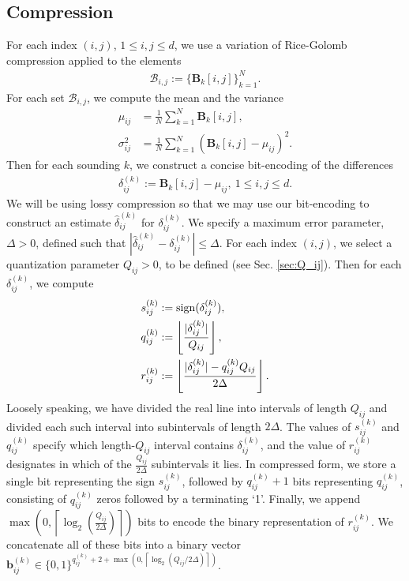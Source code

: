 \documentclass{article}
\begin{document}
\subsection{Compression}
\label{sec:compression} 
For each index $(i, j)$, $1 \le i,j \le d$, we use a variation of Rice-Golomb compression applied to the elements 
\begin{align} \mathcal{B}_{i,j} := \{\mathbf{B}_k[i, j]\}_{k = 1}^N.
\end{align} 
For each set $\mathcal{B}_{i,j}$, we compute the mean and the variance
\begin{align} 
\mu_{ij} & = \frac{1}{N} \sum_{k = 1}^N \mathbf{B}_k[i, j], \\ 
\sigma^2_{ij} & = \frac{1}{N} \sum_{k = 1}^N (\mathbf{B}_k[i, j] - \mu_{ij})^2. 
\end{align}  
Then for each sounding $k$, we construct a concise bit-encoding of the differences 
\begin{align} 
\delta^{(k)}_{ij} := \mathbf{B}_k[i,j] - \mu_{ij}, ~ 1 \le i,j \le d. 
\end{align} 
We will be using lossy compression so that we may use our bit-encoding to construct an estimate $\hat{\delta}^{(k)}_{ij}$ for $\delta^{(k)}_{ij}$. We specify a maximum error parameter, $\Delta > 0$, defined such that $| \hat{\delta}^{(k)}_{ij} - \delta^{(k)}_{ij}|\le \Delta$. For each index $(i, j)$, we select a quantization parameter $Q_{ij} > 0$, to be defined (see Sec. \ref{sec:Q_ij}). Then for each $\delta^{(k)}_{ij}$, we compute 
\begin{align} 
s^{(k)}_{ij} & := {\rm sign}(\delta^{(k)}_{ij}), \\ 
q^{(k)}_{ij} & := \left \lfloor \frac{|\delta^{(k)}_{ij}|}{Q_{ij}} \right \rfloor, \\ 
r^{(k)}_{ij} & := \left \lfloor \frac{|\delta^{(k)}_{ij}| - q^{(k)}_{ij} Q_{ij}}{2\Delta} \right \rfloor. 
\end{align} 
Loosely speaking, we have divided the real line into intervals of length $Q_{ij}$ and divided each such interval into subintervals of length $2\Delta$. The values of $s^{(k)}_{ij}$ and $q^{(k)}_{ij}$ specify which length-$Q_{ij}$ interval contains $\delta^{(k)}_{ij}$, and the value of $r^{(k)}_{ij}$ designates in which of the $\frac{Q_{ij}}{2 \Delta}$ subintervals it lies. In compressed form, we store a single bit representing the sign $s^{(k)}_{ij}$, followed by $q^{(k)}_{ij} + 1$ bits representing $q^{(k)}_{ij}$, consisting of $q^{(k)}_{ij}$ zeros followed by a terminating `1'. Finally, we append $\max \left( 0, \left \lceil \log_2\left( \frac{Q_{ij}}{2 \Delta} \right) \right \rceil \right)$ bits to encode the binary representation of $r^{(k)}_{ij}$. We concatenate all of these bits into a binary vector $\mathbf{b}^{(k)}_{ij} \in \{0, 1\}^{q^{(k)}_{ij} + 2 + \max(0, \left \lceil \log_2\left( {Q_{ij}} / {2 \Delta} \right) \right \rceil )}$. 
\end{document}
